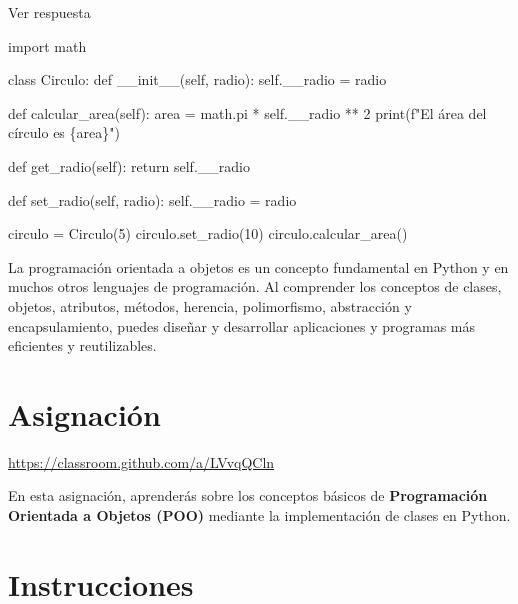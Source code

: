 \documentclass[
  a4paper,
  DIV=11,
  numbers=noendperiod,
  onepage,
  openany]{scrreprt}
\newenvironment{Shaded}{\begin{snugshade}}{\end{snugshade}}
\newcommand{\BuiltInTok}[1]{\textcolor[rgb]{0.00,0.23,0.31}{#1}}
\newcommand{\ControlFlowTok}[1]{\textcolor[rgb]{0.00,0.23,0.31}{#1}}
\newcommand{\DecValTok}[1]{\textcolor[rgb]{0.68,0.00,0.00}{#1}}
\newcommand{\FunctionTok}[1]{\textcolor[rgb]{0.28,0.35,0.67}{#1}}
\newcommand{\ImportTok}[1]{\textcolor[rgb]{0.00,0.46,0.62}{#1}}
\newcommand{\KeywordTok}[1]{\textcolor[rgb]{0.00,0.23,0.31}{#1}}
\newcommand{\NormalTok}[1]{\textcolor[rgb]{0.00,0.23,0.31}{#1}}
\newcommand{\OperatorTok}[1]{\textcolor[rgb]{0.37,0.37,0.37}{#1}}
\newcommand{\SpecialCharTok}[1]{\textcolor[rgb]{0.37,0.37,0.37}{#1}}
\newcommand{\SpecialStringTok}[1]{\textcolor[rgb]{0.13,0.47,0.30}{#1}}
\newcommand{\VariableTok}[1]{\textcolor[rgb]{0.07,0.07,0.07}{#1}}
\begin{document}
Ver respuesta

\begin{Shaded}
\begin{Highlighting}[]
\ImportTok{import}\NormalTok{ math}

\KeywordTok{class}\NormalTok{ Circulo:}
    \KeywordTok{def} \FunctionTok{\_\_init\_\_}\NormalTok{(}\VariableTok{self}\NormalTok{, radio):}
        \VariableTok{self}\NormalTok{.\_\_radio }\OperatorTok{=}\NormalTok{ radio}

    \KeywordTok{def}\NormalTok{ calcular\_area(}\VariableTok{self}\NormalTok{):}
\NormalTok{        area }\OperatorTok{=}\NormalTok{ math.pi }\OperatorTok{*} \VariableTok{self}\NormalTok{.\_\_radio }\OperatorTok{**} \DecValTok{2}
        \BuiltInTok{print}\NormalTok{(}\SpecialStringTok{f"El área del círculo es }\SpecialCharTok{\{}\NormalTok{area}\SpecialCharTok{\}}\SpecialStringTok{"}\NormalTok{)}

    \KeywordTok{def}\NormalTok{ get\_radio(}\VariableTok{self}\NormalTok{):}
        \ControlFlowTok{return} \VariableTok{self}\NormalTok{.\_\_radio}

    \KeywordTok{def}\NormalTok{ set\_radio(}\VariableTok{self}\NormalTok{, radio):}
        \VariableTok{self}\NormalTok{.\_\_radio }\OperatorTok{=}\NormalTok{ radio}
        
\NormalTok{circulo }\OperatorTok{=}\NormalTok{ Circulo(}\DecValTok{5}\NormalTok{)}
\NormalTok{circulo.set\_radio(}\DecValTok{10}\NormalTok{)}
\NormalTok{circulo.calcular\_area()}
\end{Highlighting}
\end{Shaded}

La programación orientada a objetos es un concepto fundamental en Python
y en muchos otros lenguajes de programación. Al comprender los conceptos
de clases, objetos, atributos, métodos, herencia, polimorfismo,
abstracción y encapsulamiento, puedes diseñar y desarrollar aplicaciones
y programas más eficientes y reutilizables.

\section{Asignación}\label{asignaciuxf3n-4}

\url{https://classroom.github.com/a/LVvqQCln}

En esta asignación, aprenderás sobre los conceptos básicos de
\textbf{Programación Orientada a Objetos (POO)} mediante la
implementación de clases en Python.

\section{Instrucciones}\label{instrucciones}
\end{document}
